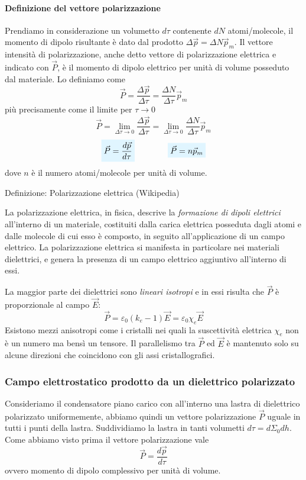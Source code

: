 \documentclass[x11names]{report}
\newcommand{\definizione}[2]{
	\begin{center}
		\fboxsep11pt
		\colorbox{myblue}{\begin{minipage}{5.75in}
				\begin{blues}{Definizione: #1}
					#2
				\end{blues}
		\end{minipage}}
	\end{center}
}
\newcommand{\viola}[1]{%
	\colorbox{myblue}{$\displaystyle #1$}
}
\begin{document}
\paragraph*{Definizione del vettore polarizzazione}
Prendiamo in considerazione un volumetto \(d\tau\) contenente \(dN\) atomi/molecole, il momento di dipolo risultante è dato dal prodotto \(\Delta\vec{p} = \Delta N \vec{p}_m\).  Il vettore intensità di polarizzazione, anche detto vettore di polarizzazione elettrica e indicato con \(\vec{P}\), è il momento di dipolo elettrico per unità di volume posseduto dal materiale. Lo definiamo come
\[
\vec{P} =\frac{\Delta \vec{p}}{\Delta\tau} = \frac{\Delta N}{\Delta \tau}\vec{p}_m
\]
più precisamente come il limite per \(\tau \to 0\)
\[
\vec{P} = \lim_{\Delta\tau\to 0}\frac{\Delta \vec{p}}{\Delta\tau} = \lim_{\Delta\tau\to 0}\frac{\Delta N}{\Delta \tau}\vec{p}_m
\]
\begin{equation}
\viola{\vec{P}= \frac{d \vec{p}}{d\tau}} \qquad \qquad	\viola{\vec{P} = n\vec{p}_m}
\end{equation}
dove \(n\) è il numero atomi/molecole per unità di volume. 
\definizione{Polarizzazione elettrica (Wikipedia)}{
La polarizzazione elettrica, in fisica, descrive la \textit{formazione di dipoli elettrici} all'interno di un materiale, costituiti dalla carica elettrica posseduta dagli atomi e dalle molecole di cui esso è composto, in seguito all'applicazione di un campo elettrico. La polarizzazione elettrica si manifesta in particolare nei materiali dielettrici, e genera la presenza di un campo elettrico aggiuntivo all'interno di essi.}


La maggior parte dei dielettrici sono \textit{lineari isotropi} e in essi risulta che \(\vec{P}\) è proporzionale al campo \(\vec{E}\):
\[
\vec{P} = \varepsilon_0(k_e -1)\vec{E} = \varepsilon_0 \chi_e \vec{E}
\]
Esistono mezzi anisotropi come i cristalli nei quali la suscettività elettrica \(\chi_e\) non è un numero ma bensì un tensore. Il parallelismo tra \(\vec{P}\) ed \(\vec{E}\) è mantenuto solo su alcune direzioni che coincidono con gli assi cristallografici.

\subsubsection{Campo elettrostatico prodotto da un dielettrico polarizzato}
Consideriamo il condensatore piano carico con all'interno una lastra di dielettrico polarizzato uniformemente, abbiamo quindi un vettore polarizzazione \(\vec{P}\) uguale in tutti i punti della lastra. Suddividiamo la lastra in tanti volumetti \(d\tau = d\Sigma_0 dh\). Come abbiamo visto prima il vettore polarizzazione vale
\[
\vec{P} = \frac{d\vec{p}}{d\tau}
\]
ovvero momento di dipolo complessivo per unità di volume.
\end{document}
